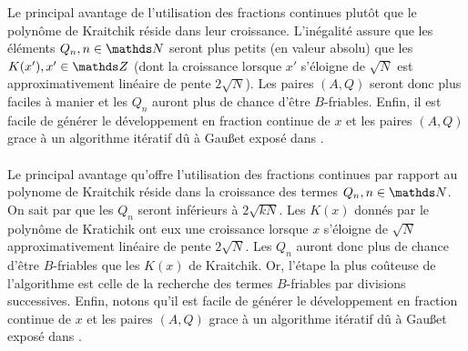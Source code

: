 Le principal avantage de l'utilisation des fractions continues plutôt que le
polynôme de Kraitchik réside dans leur croissance. L'inégalité  assure
que les éléments $Q_n, n\in \N$ seront plus petits (en valeur absolu) que les
$K(x'), x'\in \Z$ (dont la croissance lorsque $x'$ s'éloigne de $\sqrt{N}$ est
approximativement linéaire de pente $2\sqrt{N}$). Les paires $(A, Q)$ seront
donc plus faciles à manier et les $Q_n$ auront plus de chance d'être $B$-friables.
Enfin, il est facile de générer le développement en fraction continue de $x$ et 
les paires $(A, Q)$ grace à un algorithme itératif dû à Gau\ss et exposé dans 
. \\

 \\

Le principal avantage qu'offre l'utilisation des fractions continues par 
rapport au polynome de Kraitchik réside dans la croissance des termes $Q_n,
n\in \N$. On sait par  que les $Q_n$ seront inférieurs à 
$2 \sqrt{kN}$. Les $K(x)$ donnés par le polynôme de Kratichik ont eux une croissance
lorsque $x$ s'éloigne de $\sqrt{N}$ approximativement linéaire de pente
$2 \sqrt{N}$. Les $Q_n$ auront donc plus de chance d'être  $B$-friables que les
$K(x)$ de Kraitchik. Or, l'étape la plus coûteuse de l'algorithme est celle de la
recherche des termes $B$-friables par divisions successives. Enfin, notons qu'il
est facile de générer le développement en fraction continue de $x$ et les paires
$(A, Q)$ grace à un algorithme itératif dû à Gau\ss et exposé dans . \\

